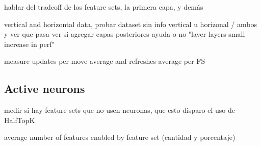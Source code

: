 hablar del tradeoff de los feature sets, la primera capa, y demás

vertical and horizontal data, probar dataset sin info vertical u horizonal / ambos y ver que pasa
ver si agregar capas posteriores ayuda o no "layer layers small increase in perf"

measure updates per move average and refreshes average per FS



\subsection{Active neurons}

medir si hay feature sets que no usen neuronas, que esto disparo el uso de HalfTopK

average number of features enabled by feature set (cantidad y porcentaje)



